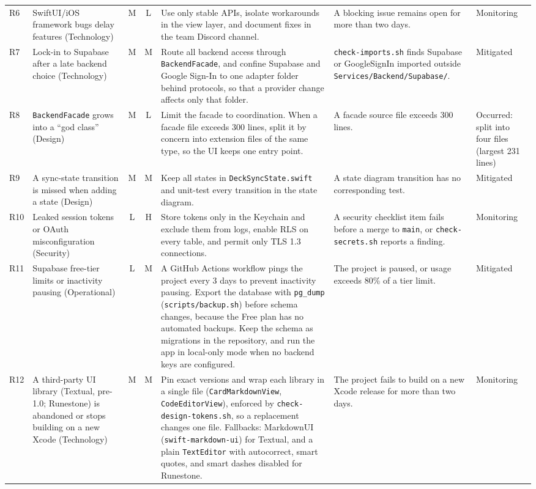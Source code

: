 \documentclass[12pt,letterpaper]{article}
\begin{document}
\begin{xltabular}{\textwidth}{@{}l L{3.0cm} c c Y L{2.9cm} L{1.7cm}@{}}
R6 & SwiftUI/iOS framework bugs delay features (Technology) & M & L & Use only stable APIs, isolate workarounds in the view layer, and document fixes in the team Discord channel. & A blocking issue remains open for more than two days. & Monitoring \\
R7 & Lock-in to Supabase after a late backend choice (Technology) & M & M & Route all backend access through \texttt{BackendFacade}, and confine Supabase and Google Sign-In to one adapter folder behind protocols, so that a provider change affects only that folder. & \texttt{check-imports.sh} finds Supabase or GoogleSignIn imported outside \texttt{Services/\allowbreak Backend/\allowbreak Supabase/}. & Mitigated \\
R8 & \texttt{BackendFacade} grows into a ``god class'' (Design) & M & L & Limit the facade to coordination. When a facade file exceeds 300 lines, split it by concern into extension files of the same type, so the UI keeps one entry point. & A facade source file exceeds 300 lines. & Occurred: split into four files (largest 231 lines) \\
R9 & A sync-state transition is missed when adding a state (Design) & M & M & Keep all states in \texttt{DeckSyncState.swift} and unit-test every transition in the state diagram. & A state diagram transition has no corresponding test. & Mitigated \\
R10 & Leaked session tokens or OAuth misconfiguration (Security) & L & H & Store tokens only in the Keychain and exclude them from logs, enable RLS on every table, and permit only TLS 1.3 connections. & A security checklist item fails before a merge to \texttt{main}, or \texttt{check-secrets.sh} reports a finding. & Monitoring \\
R11 & Supabase free-tier limits or inactivity pausing (Operational) & L & M & A GitHub Actions workflow pings the project every 3 days to prevent inactivity pausing. Export the database with \texttt{pg\_dump} (\texttt{scripts/backup.sh}) before schema changes, because the Free plan has no automated backups. Keep the schema as migrations in the repository, and run the app in local-only mode when no backend keys are configured. & The project is paused, or usage exceeds 80\% of a tier limit. & Mitigated \\
R12 & A third-party UI library (Textual, pre-1.0; Runestone) is abandoned or stops building on a new Xcode (Technology) & M & M & Pin exact versions and wrap each library in a single file (\texttt{CardMarkdownView}, \texttt{CodeEditorView}), enforced by \texttt{check-design-tokens.sh}, so a replacement changes one file. Fallbacks: MarkdownUI (\texttt{swift-markdown-ui}) for Textual, and a plain \texttt{TextEditor} with autocorrect, smart quotes, and smart dashes disabled for Runestone. & The project fails to build on a new Xcode release for more than two days. & Monitoring \\

\end{xltabular}
\end{document}
